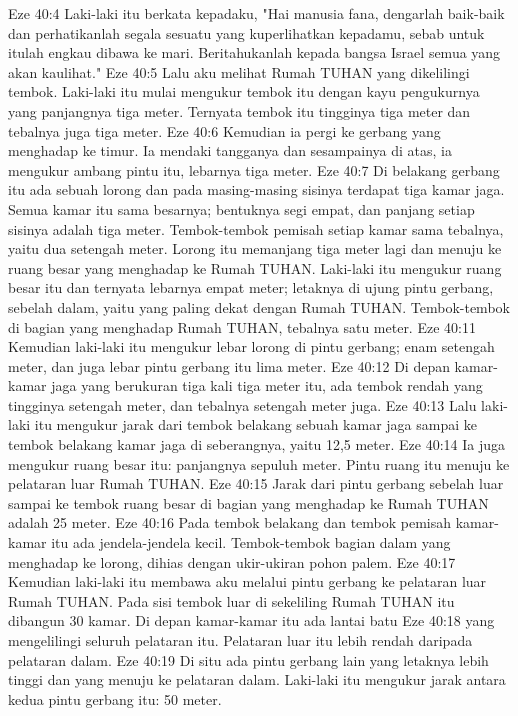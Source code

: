 Eze 40:4  Laki-laki itu berkata kepadaku, "Hai manusia fana, dengarlah baik-baik dan perhatikanlah segala sesuatu yang kuperlihatkan kepadamu, sebab untuk itulah engkau dibawa ke mari. Beritahukanlah kepada bangsa Israel semua yang akan kaulihat."
Eze 40:5  Lalu aku melihat Rumah TUHAN yang dikelilingi tembok. Laki-laki itu mulai mengukur tembok itu dengan kayu pengukurnya yang panjangnya tiga meter. Ternyata tembok itu tingginya tiga meter dan tebalnya juga tiga meter.
Eze 40:6  Kemudian ia pergi ke gerbang yang menghadap ke timur. Ia mendaki tangganya dan sesampainya di atas, ia mengukur ambang pintu itu, lebarnya tiga meter.
Eze 40:7  Di belakang gerbang itu ada sebuah lorong dan pada masing-masing sisinya terdapat tiga kamar jaga. Semua kamar itu sama besarnya; bentuknya segi empat, dan panjang setiap sisinya adalah tiga meter. Tembok-tembok pemisah setiap kamar sama tebalnya, yaitu dua setengah meter. Lorong itu memanjang tiga meter lagi dan menuju ke ruang besar yang menghadap ke Rumah TUHAN. Laki-laki itu mengukur ruang besar itu dan ternyata lebarnya empat meter; letaknya di ujung pintu gerbang, sebelah dalam, yaitu yang paling dekat dengan Rumah TUHAN. Tembok-tembok di bagian yang menghadap Rumah TUHAN, tebalnya satu meter.
Eze 40:11  Kemudian laki-laki itu mengukur lebar lorong di pintu gerbang; enam setengah meter, dan juga lebar pintu gerbang itu lima meter.
Eze 40:12  Di depan kamar-kamar jaga yang berukuran tiga kali tiga meter itu, ada tembok rendah yang tingginya setengah meter, dan tebalnya setengah meter juga.
Eze 40:13  Lalu laki-laki itu mengukur jarak dari tembok belakang sebuah kamar jaga sampai ke tembok belakang kamar jaga di seberangnya, yaitu 12,5 meter.
Eze 40:14  Ia juga mengukur ruang besar itu: panjangnya sepuluh meter. Pintu ruang itu menuju ke pelataran luar Rumah TUHAN.
Eze 40:15  Jarak dari pintu gerbang sebelah luar sampai ke tembok ruang besar di bagian yang menghadap ke Rumah TUHAN adalah 25 meter.
Eze 40:16  Pada tembok belakang dan tembok pemisah kamar-kamar itu ada jendela-jendela kecil. Tembok-tembok bagian dalam yang menghadap ke lorong, dihias dengan ukir-ukiran pohon palem.
Eze 40:17  Kemudian laki-laki itu membawa aku melalui pintu gerbang ke pelataran luar Rumah TUHAN. Pada sisi tembok luar di sekeliling Rumah TUHAN itu dibangun 30 kamar. Di depan kamar-kamar itu ada lantai batu
Eze 40:18  yang mengelilingi seluruh pelataran itu. Pelataran luar itu lebih rendah daripada pelataran dalam.
Eze 40:19  Di situ ada pintu gerbang lain yang letaknya lebih tinggi dan yang menuju ke pelataran dalam. Laki-laki itu mengukur jarak antara kedua pintu gerbang itu: 50 meter.
